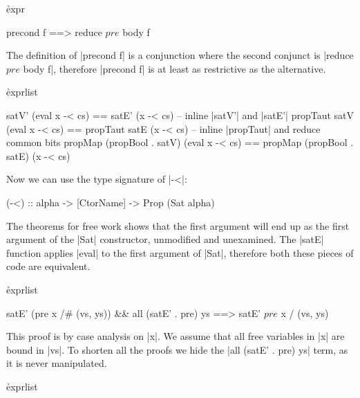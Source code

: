 
\h{expr}\begin{code}
precond f ==> reduce $ pre $ body f
\end{code}

The definition of |precond f| is a conjunction where the second conjunct is |reduce $ pre $ body f|, therefore |precond f| is at least as restrictive as the alternative.



\h{exprlist}\begin{code}
satV' (eval x -< cs) == satE' (x -< cs)
    -- inline |satV'| and |satE'|
propTaut satV (eval x -< cs) == propTaut satE (x -< cs)
    -- inline |propTaut| and reduce common bits
propMap (propBool . satV) (eval x -< cs) == propMap (propBool . satE) (x -< cs)
\end{code}

Now we can use the type signature of |-<|:

\begin{code}
(-<) :: alpha -> [CtorName] -> Prop (Sat alpha)
\end{code}

The theorems for free work \cite{wadler:theorems} shows that the first argument will end up as the first argument of the |Sat| constructor, unmodified and unexamined. The |satE| function applies |eval| to the first argument of |Sat|, therefore both these pieces of code are equivalent.



\h{exprlist}\begin{code}
satE' (pre x /# (vs, ys)) && all (satE' . pre) ys ==> satE' $ pre $ x / (vs, ys)
\end{code}

This proof is by case analysis on |x|. We assume that all free variables in |x| are bound in |vs|. To shorten all the proofs we hide the |all (satE' . pre) ys| term, as it is never manipulated.


\h{exprlist}

